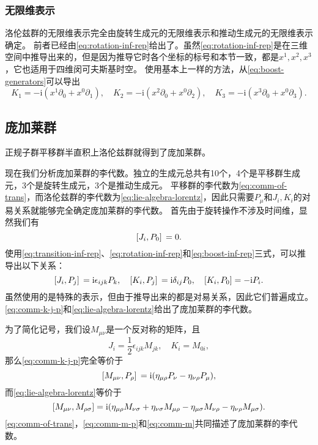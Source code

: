 \documentclass[hyperref, UTF8, a4paper]{ctexart}
\newcommand*{\ii}{\mathrm{i}}
\begin{document}
\subsubsection{无限维表示}

洛伦兹群的无限维表示完全由旋转生成元的无限维表示和推动生成元的无限维表示确定。
前者已经由\eqref{eq:rotation-inf-rep}给出了。虽然\eqref{eq:rotation-inf-rep}是在三维空间中推导出来的，但是因为推导它时各个坐标的标号和本节一致，都是$x^1, x^2, x^3$，它也适用于四维闵可夫斯基时空。
使用基本上一样的方法，从\eqref{eq:boost-generators}可以导出
\begin{equation}
    K_1 = - \ii (x^1 \partial_0 + x^0 \partial_1), \quad K_2 = - \ii (x^2 \partial_0 + x^0 \partial_2), \quad K_3 = - \ii (x^3 \partial_0 + x^0 \partial_3).
    \label{eq:boost-inf-rep}
\end{equation}

\subsection{庞加莱群}

正规子群平移群半直积上洛伦兹群就得到了庞加莱群。

现在我们分析庞加莱群的李代数。独立的生成元总共有10个，4个是平移群生成元，3个是旋转生成元，3个是推动生成元。
平移群的李代数为\eqref{eq:comm-of-trans}，而洛伦兹群的李代数为\eqref{eq:lie-algebra-lorentz}，因此只需要$P_\mu$和$J_i,K_i$的对易关系就能够完全确定庞加莱群的李代数。
首先由于旋转操作不涉及时间维，显然我们有
\begin{equation}
    \comm*{J_i}{P_0} = 0.
\end{equation}
使用\eqref{eq:transition-inf-rep}、\eqref{eq:rotation-inf-rep}和\eqref{eq:boost-inf-rep}三式，可以推导出以下关系：
\begin{equation}
    \comm*{J_i}{P_j} = \ii \epsilon_{ijk} P_k, \quad \comm*{K_i}{P_j} = \ii \delta_{ij} P_0, \quad \comm{K_i}{P_0} = - \ii P_i.
    \label{eq:comm-k-j-p}
\end{equation}
虽然使用的是特殊的表示，但由于推导出来的都是对易关系，因此它们普遍成立。
\eqref{eq:comm-k-j-p}和\eqref{eq:lie-algebra-lorentz}给出了庞加莱群的李代数。

为了简化记号，我们设$M_{\mu \nu}$是一个反对称的矩阵，且
\begin{equation}
    J_i = \frac{1}{2} \epsilon_{ijk} M_{jk}, \quad K_i = M_{0i},
\end{equation}
那么\eqref{eq:comm-k-j-p}完全等价于
\begin{equation}
    \comm*{M_{\mu \nu}}{P_\rho} = \ii (\eta_{\mu \rho} P_\nu - \eta_{\nu \rho} P_\mu),
    \label{eq:comm-m-p}
\end{equation}
而\eqref{eq:lie-algebra-lorentz}等价于
\begin{equation}
    \comm{M_{\mu \nu}}{M_{\rho \sigma}}  = \ii (\eta_{\mu \rho} M_{\nu \sigma} + \eta_{\nu \sigma} M_{\mu \rho} - \eta_{\mu \sigma} M_{\nu \rho} - \eta_{\nu \rho} M_{\mu \sigma}).
    \label{eq:comm-m}
\end{equation}
\eqref{eq:comm-of-trans}，\eqref{eq:comm-m-p}和\eqref{eq:comm-m}共同描述了庞加莱群的李代数。
\end{document}
